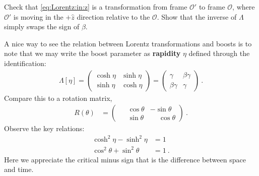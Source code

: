 \documentclass[12pt, oneside]{report}    %
\begin{document}
\begin{exercise}
Check that \eqref{eq:Lorentz:in:z} is a transformation from frame $\mathcal O'$
 to frame $\mathcal O$, where $\mathcal O'$ is moving in the $+\hat{z}$ direction relative to the $\mathcal O$. Show that the inverse of $\Lambda$ simply swaps the sign of $\beta$. 
\end{exercise}
\begin{example}
A nice way to see the relation between Lorentz transformations and boosts is to note that we may write the boost parameter as \textbf{rapidity} $\eta$ defined through the identification:
\begin{align}
    \Lambda[\eta] = 
    \begin{pmatrix}
        \cosh \eta & \sinh \eta \\
        \sinh \eta & \cosh \eta
    \end{pmatrix}
    =
    \begin{pmatrix}
        \gamma & \beta\gamma \\
        \beta \gamma & \gamma
    \end{pmatrix} \ .
\end{align}
Compare this to a rotation matrix,
\begin{align}
    R(\theta) &=
    \begin{pmatrix}
        \phantom{+}\cos \theta & -\sin\theta \\
        \phantom{+}\sin \theta & \phantom{+}\cos\theta
    \end{pmatrix} \ .
    \label{eq:eg:rotations}
\end{align}
Observe the key relations:
\begin{align}
    \cosh^2 \eta - \sinh^2 \eta &= 1\\
    \cos^2 \theta + \sin^2 \theta &=1 \ .
\end{align}
Here we appreciate the critical minus sign that is the difference between space and time.\sidenotemark
\end{example}
\end{document}
